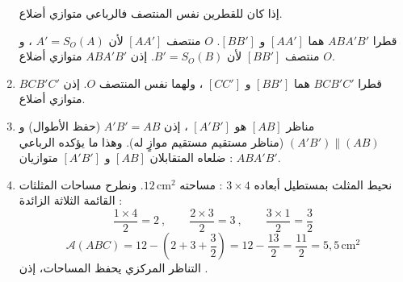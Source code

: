 \documentclass[12pt,a4paper]{article}
\newcommand{\cm}{\,\mathrm{cm}}
\begin{document}
\begin{corr}[title={تركيب : مثلث ومناظره}, stars=3, source={Axiomaths}]
\begin{enumerate}[itemsep=14pt]
\begin{prop}
  إذا كان للقطرين نفس المنتصف فالرباعي متوازي أضلاع.
  \end{prop}
  قطرا $ABA'B'$ هما $[AA']$ و $[BB']$. $O$ منتصف $[AA']$ لأن $A'=S_O(A)$ ، و $O$ منتصف $[BB']$ لأن $B'=S_O(B)$. إذن $ABA'B'$ متوازي أضلاع.
  \item قطرا $BCB'C'$ هما $[BB']$ و $[CC']$ ، ولهما نفس المنتصف $O$. إذن $BCB'C'$ متوازي أضلاع.
  \item مناظر $[AB]$ هو $[A'B']$ ، إذن $A'B'=AB$ (حفظ الأطوال) و $(A'B')\parallel(AB)$ (مناظر مستقيم مستقيم موازٍ له). وهذا ما يؤكده الرباعي $ABA'B'$ : ضلعاه المتقابلان $[AB]$ و $[A'B']$ متوازيان.
  \item نحيط المثلث بمستطيل أبعاده $3\times4$ : مساحته $12\cm^2$. ونطرح مساحات المثلثات القائمة الثلاثة الزائدة :
  \[\dfrac{1\times4}{2}=2\ ,\qquad \dfrac{2\times3}{2}=3\ ,\qquad \dfrac{3\times1}{2}=\dfrac{3}{2}\]
  \[\mathcal{A}(ABC)=12-\left(2+3+\dfrac{3}{2}\right)=12-\dfrac{13}{2}=\dfrac{11}{2}=5{,}5\cm^2\]
  التناظر المركزي يحفظ المساحات، إذن \ib{$\mathcal{A}(A'B'C')=5{,}5\cm^2$}.
\end{enumerate}
\end{corr}
\end{document}

